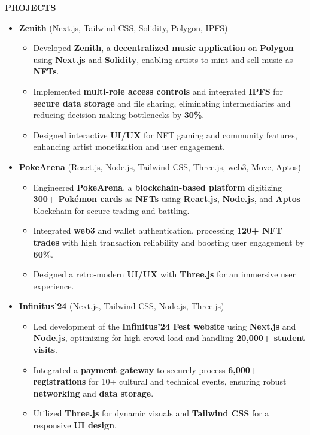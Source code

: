 \documentclass[a4paper,10pt]{article}
\newcommand{\resheading}[1]{%
  \vspace{1em}%
  \noindent\colorbox{mygrey}{%
    \parbox{\dimexpr\linewidth-2\fboxsep\relax}{%
      \textbf{#1}%
    }%
  }%
  \vspace{0.6em}%
}
\begin{document}
\resheading{PROJECTS}
\vspace{0.4em}
\begin{itemize}
  \item \textbf{Zenith} \hfill (Next.js, Tailwind CSS, Solidity, Polygon, IPFS)
  \begin{itemize}
    \item Developed \textbf{Zenith}, a \textbf{decentralized music application} on \textbf{Polygon} using \textbf{Next.js} and \textbf{Solidity}, enabling artists to mint and sell music as \textbf{NFTs}.
    \item Implemented \textbf{multi-role access controls} and integrated \textbf{IPFS} for \textbf{secure data storage} and file sharing, eliminating intermediaries and reducing decision-making bottlenecks by \textbf{30\%}.
    \item Designed interactive \textbf{UI/UX} for NFT gaming and community features, enhancing artist monetization and user engagement.
  \end{itemize}

  \item \textbf{PokeArena} \hfill (React.js, Node.js, Tailwind CSS, Three.js, web3, Move, Aptos)
  \begin{itemize}
    \item Engineered \textbf{PokeArena}, a \textbf{blockchain-based platform} digitizing \textbf{300+ Pokémon cards} as \textbf{NFTs} using \textbf{React.js}, \textbf{Node.js}, and \textbf{Aptos} blockchain for secure trading and battling.
    \item Integrated \textbf{web3} and wallet authentication, processing \textbf{120+ NFT trades} with high transaction reliability and boosting user engagement by \textbf{60\%}.
    \item Designed a retro-modern \textbf{UI/UX} with \textbf{Three.js} for an immersive user experience.
  \end{itemize}

  \item \textbf{Infinitus’24} \hfill (Next.js, Tailwind CSS, Node.js, Three.js)
  \begin{itemize}
    \item Led development of the \textbf{Infinitus’24 Fest website} using \textbf{Next.js} and \textbf{Node.js}, optimizing for high crowd load and handling \textbf{20,000+ student visits}.
    \item Integrated a \textbf{payment gateway} to securely process \textbf{6,000+ registrations} for 10+ cultural and technical events, ensuring robust \textbf{networking} and \textbf{data storage}.
    \item Utilized \textbf{Three.js} for dynamic visuals and \textbf{Tailwind CSS} for a responsive \textbf{UI design}.
  \end{itemize}
\end{itemize}
\end{document}
